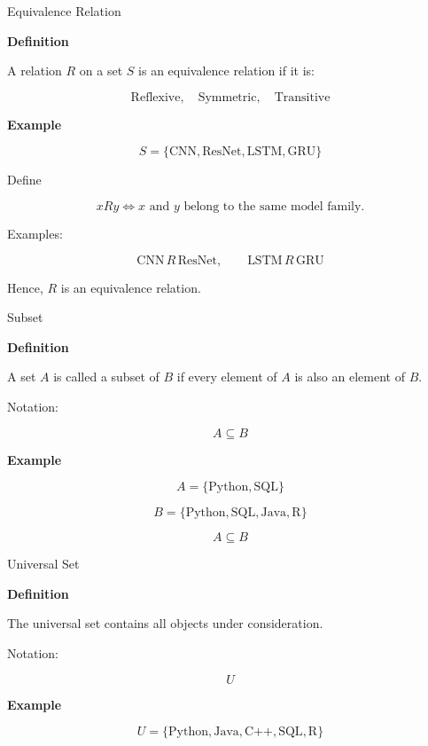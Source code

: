 \documentclass{beamer}
\begin{document}
\begin{frame}{Equivalence Relation}

\small

\textbf{Definition}

A relation $R$ on a set $S$ is an equivalence relation if it is:

\[
\text{Reflexive},\quad
\text{Symmetric},\quad
\text{Transitive}
\]

\vspace{0.2cm}

\textbf{Example }

\[
S=\{\text{CNN},\text{ResNet},\text{LSTM},\text{GRU}\}
\]

Define

\[
xRy \iff x \text{ and } y
\text{ belong to the same model family.}
\]

Examples:

\[
\text{CNN}\,R\,\text{ResNet},\qquad
\text{LSTM}\,R\,\text{GRU}
\]

Hence, $R$ is an equivalence relation.

\end{frame}
\begin{frame}{Subset}

\small

\textbf{Definition}

A set $A$ is called a subset of $B$ if every element of $A$ is also an element of $B$.

Notation:

\[
A\subseteq B
\]

\textbf{Example}

\[
A=\{\text{Python},\text{SQL}\}
\]

\[
B=\{\text{Python},\text{SQL},\text{Java},\text{R}\}
\]

\[
A\subseteq B
\]

\end{frame}

\begin{frame}{Universal Set}

\small

\textbf{Definition}

The universal set contains all objects under consideration.

Notation:

\[
U
\]

\textbf{Example}

\[
U=\{\text{Python},\text{Java},\text{C++},\text{SQL},\text{R}\}
\]

\end{frame}
\end{document}
